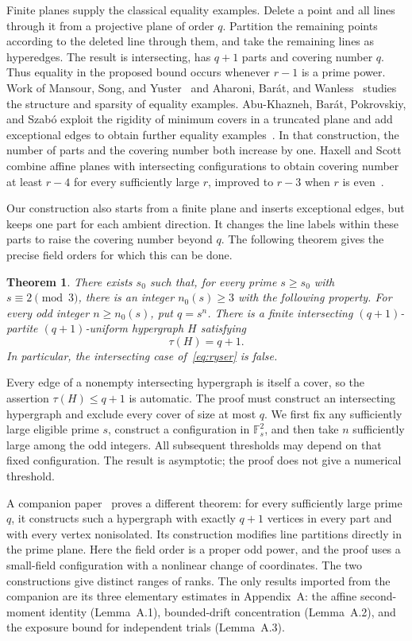 \documentclass[11pt]{article}
\newtheorem{theorem}{Theorem}[section]
\theoremstyle{remark}
\newcommand{\F}{\mathbb F}
\begin{document}
Finite planes supply the classical equality examples. Delete a point
and all lines through it from a projective plane of order $q$. Partition
the remaining points according to the deleted line through them, and
take the remaining lines as hyperedges. The result is intersecting,
has $q+1$ parts and covering number $q$. Thus equality in the proposed
bound occurs whenever $r-1$ is a prime power. Work of Mansour, Song, and
Yuster~\cite{MansourSongYuster2009} and Aharoni, Bar\'{a}t, and
Wanless~\cite{AharoniBaratWanless2016} studies the structure and sparsity
of equality examples. Abu-Khazneh, Bar\'{a}t, Pokrovskiy, and
Szab\'{o} exploit the rigidity of minimum covers in a truncated plane
and add exceptional edges to obtain further equality
examples~\cite{AbuKhaznehBaratPokrovskiySzabo2019}. In that construction,
the number of parts and the covering number both increase by one.
Haxell and Scott combine affine planes with intersecting configurations
to obtain covering number at least $r-4$ for every sufficiently large
$r$, improved to $r-3$ when $r$ is even~\cite{HaxellScott2017}.

Our construction also starts from a finite plane and inserts exceptional
edges, but keeps one part for each ambient direction. It changes the
line labels within these parts to raise the covering number beyond
$q$. The following theorem gives the precise field orders for which
this can be done.

\begin{theorem}\label{thm:main}
There exists $s_0$ such that, for every prime $s\ge s_0$ with
$s\equiv2\pmod3$, there is an integer $n_0(s)\ge3$ with the following
property. For every odd integer $n\ge n_0(s)$, put $q=s^n$.
There is a finite intersecting $(q+1)$-partite $(q+1)$-uniform
hypergraph $H$ satisfying
\[
 \tau(H)=q+1.
\]
In particular, the intersecting case of~\eqref{eq:ryser} is false.
\end{theorem}

Every edge of a nonempty intersecting hypergraph is itself a cover,
so the assertion $\tau(H)\le q+1$ is automatic. The proof must construct
an intersecting hypergraph and exclude every cover of size at most $q$.
We first fix any sufficiently large eligible prime $s$, construct a
configuration in $\F_s^2$, and then take $n$ sufficiently large among
the odd integers. All subsequent thresholds may depend on that fixed
configuration. The result is asymptotic; the proof does not give a
numerical threshold.

A companion paper~\cite{OpenAI2026Balanced} proves a different theorem:
for every sufficiently large prime $q$, it constructs such a hypergraph
with exactly $q+1$ vertices in every part and with every vertex
nonisolated. Its construction modifies line partitions directly in the
prime plane. Here the field order is a proper odd power, and the proof
uses a small-field configuration with a nonlinear change of
coordinates. The two constructions give distinct ranges of ranks.
The only results imported from the companion are its three elementary
estimates in Appendix~A: the affine second-moment identity
(Lemma~A.1), bounded-drift concentration (Lemma~A.2), and the exposure
bound for independent trials (Lemma~A.3).
\end{document}
